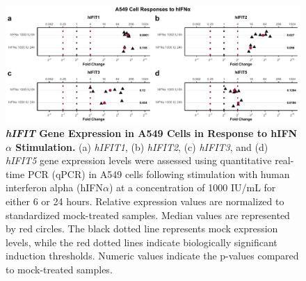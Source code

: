 \begin{figure}
    \centering
    \includegraphics[width=1\linewidth]{06. Chapter 1/Figs/01. Induction/01. a549_treat_ifna.pdf}
    \caption[\textit{hIFIT} Gene Expression in A549 Cells in Response to hIFN\(\alpha\) Stimulation.]{\textbf{\textit{hIFIT} Gene Expression in A549 Cells in Response to hIFN\(\alpha\) Stimulation.} (a) \textit{hIFIT1}, (b) \textit{hIFIT2}, (c) \textit{hIFIT3}, and (d) \textit{hIFIT5} gene expression levels were assessed using quantitative real-time PCR (qPCR) in A549 cells following stimulation with human interferon alpha (hIFN\(\alpha\)) at a concentration of 1000 IU/mL for either 6 or 24 hours. Relative expression values are normalized to standardized mock-treated samples. Median values are represented by red circles. The black dotted line represents mock expression levels, while the red dotted lines indicate biologically significant induction thresholds. Numeric values indicate the p-values compared to mock-treated samples.}
    \label{fig:A549 Response to hIFNa}
\end{figure}

